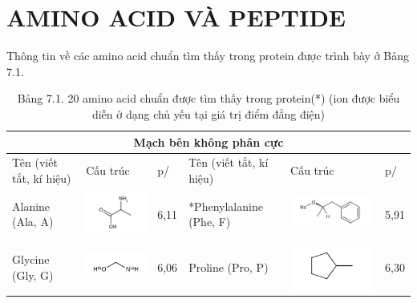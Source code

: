 \documentclass[10pt]{article}
\begin{document}
\section*{AMINO ACID VÀ PEPTIDE}
Thông tin về các amino acid chuẩn tìm thấy trong protein được trình bày ở Bảng 7.1.

\begin{table}[h]
\begin{center}
\captionsetup{labelformat=empty}
\caption{Bảng 7.1. 20 amino acid chuẩn được tìm thấy trong protein(*) (ion được biểu diễn ở dạng chủ yếu tại giá trị điểm đẳng điện)}
\begin{tabular}{|l|l|l|l|l|l|}
\hline
\multicolumn{6}{|c|}{Mạch bên không phân cực} \\
\hline
Tên (viết tắt, kí hiệu) & Cấu trúc & p/ & Tên (viết tắt, kí hiệu) & Cấu trúc & $\mathrm{p} /$ \\
\hline
Alanine (Ala, A) & \includegraphics{smile-1faaa442ddbf7aa62c60cfcbe8f775f8d423b8df} & 6,11 & *Phenylalanine (Phe, F) & \includegraphics{smile-a2e4726f1b854afe7e696be38fb5835a7849774b} & 5,91 \\
\hline
Glycine (Gly, G) & \includegraphics{smile-f796606cd7f588967afa283b34578f846c53b95b} & 6,06 & Proline (Pro, P) & \includegraphics{smile-2de0ab46dbf0573d31c9f027bee5765b2a000c4a} & 6,30 \\
\hline

\end{tabular}
\end{center}
\end{table}
\end{document}

